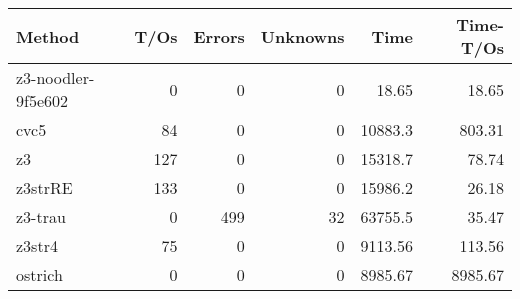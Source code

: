 \begin{tabular}{lrrrrr}
\hline
 Method             &   T/Os &   Errors &   Unknowns &     Time &   Time-T/Os \\
\hline
 z3-noodler-9f5e602 &      0 &        0 &          0 &    18.65 &       18.65 \\
 cvc5               &     84 &        0 &          0 & 10883.3  &      803.31 \\
 z3                 &    127 &        0 &          0 & 15318.7  &       78.74 \\
 z3strRE            &    133 &        0 &          0 & 15986.2  &       26.18 \\
 z3-trau            &      0 &      499 &         32 & 63755.5  &       35.47 \\
 z3str4             &     75 &        0 &          0 &  9113.56 &      113.56 \\
 ostrich            &      0 &        0 &          0 &  8985.67 &     8985.67 \\
\hline
\end{tabular}
